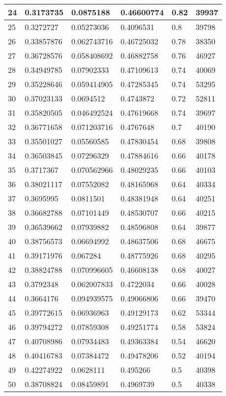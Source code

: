 \begin{longtable}{|l|l|l|l|l|l|}
24 & 0.3173735 & 0.0875188 & 0.46600774 & 0.82 & 39937 \\ \hline 
25 & 0.3272727 & 0.05273036 & 0.4096531 & 0.8 & 39798 \\ \hline 
26 & 0.33857876 & 0.062743716 & 0.46725032 & 0.78 & 38350 \\ \hline 
27 & 0.36728576 & 0.058408692 & 0.46882758 & 0.76 & 46927 \\ \hline 
28 & 0.34949785 & 0.07902333 & 0.47109613 & 0.74 & 40069 \\ \hline 
29 & 0.35228646 & 0.059414905 & 0.47285345 & 0.74 & 53295 \\ \hline 
30 & 0.37023133 & 0.0694512 & 0.4743872 & 0.72 & 52811 \\ \hline 
31 & 0.35820505 & 0.046492524 & 0.47619668 & 0.74 & 39697 \\ \hline 
32 & 0.36771658 & 0.071203716 & 0.4767648 & 0.7 & 40190 \\ \hline 
33 & 0.35501027 & 0.05560585 & 0.47830454 & 0.68 & 39808 \\ \hline 
34 & 0.36503845 & 0.07296329 & 0.47884616 & 0.66 & 40178 \\ \hline 
35 & 0.3717367 & 0.070562966 & 0.48029235 & 0.66 & 40103 \\ \hline 
36 & 0.38021117 & 0.07552082 & 0.48165968 & 0.64 & 40334 \\ \hline 
37 & 0.3695995 & 0.0811501 & 0.48381948 & 0.64 & 40251 \\ \hline 
38 & 0.36682788 & 0.07101449 & 0.48530707 & 0.66 & 40215 \\ \hline 
39 & 0.36539662 & 0.07939882 & 0.48596808 & 0.64 & 39877 \\ \hline 
40 & 0.38756573 & 0.06694992 & 0.48637506 & 0.68 & 46675 \\ \hline 
41 & 0.39171976 & 0.067284 & 0.48775926 & 0.68 & 40295 \\ \hline 
42 & 0.38824788 & 0.070996605 & 0.46608138 & 0.68 & 40027 \\ \hline 
43 & 0.3792348 & 0.062007833 & 0.4722034 & 0.66 & 40028 \\ \hline 
44 & 0.3664176 & 0.094939575 & 0.49066806 & 0.66 & 39470 \\ \hline 
45 & 0.39772615 & 0.06936963 & 0.49129173 & 0.62 & 53344 \\ \hline 
46 & 0.39794272 & 0.07859308 & 0.49251774 & 0.58 & 53824 \\ \hline 
47 & 0.40708986 & 0.07934483 & 0.49363384 & 0.54 & 46620 \\ \hline 
48 & 0.40416783 & 0.07384472 & 0.49478206 & 0.52 & 40194 \\ \hline 
49 & 0.42274922 & 0.0628111 & 0.495266 & 0.5 & 40398 \\ \hline 
50 & 0.38708824 & 0.08459891 & 0.4969739 & 0.5 & 40338 \\ \hline 
\end{longtable}